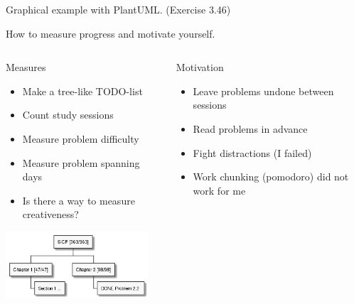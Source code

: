 \documentclass[presentation, CJK, compress,aspectratio=169]{beamer}
\begin{document}
\begin{frame}[label={sec:orgc10bdc8},fragile]{Graphical example with PlantUML. (Exercise 3.46)}
\end{frame}

\begin{frame}[label={sec:org56ecd3f}]{How to measure progress and motivate yourself.}
\begin{columns}[t]
\begin{column}{0.45\columnwidth}
\begin{block}{Measures}
\begin{itemize}
\item Make a tree-like TODO-list
\item Count study sessions
\item Measure problem difficulty
\item Measure problem spanning days
\item Is there a way to measure creativeness?
\end{itemize}

\begin{center}
\includegraphics[height=2.5cm]{measures-breakdown.png}
\end{center}
\end{block}
\end{column}

\begin{column}{0.45\columnwidth}
\begin{block}{Motivation}
\begin{itemize}
\item Leave problems undone between sessions
\item Read problems in advance
\item Fight distractions (I failed)
\item Work chunking (pomodoro) did not work for me
\end{itemize}


\end{block}
\end{column}
\end{columns}
\end{frame}
\end{document}
